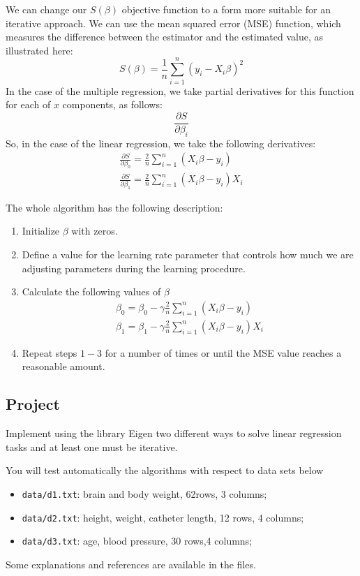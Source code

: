 \documentclass[12pt]{article}
\begin{document}
We can change our $S(\beta)$ objective function to a form more suitable for an iterative approach. We can use the mean squared error (MSE) function, which measures the difference between the estimator and the estimated value, as illustrated here:
$$
S(\beta)=\frac{1}{n} \sum_{i=1}^{n}\left(y_{i}-X_{i} \beta\right)^{2}
$$
In the case of the multiple regression, we take partial derivatives for this function for each of $x$ components, as follows:
$$
\frac{\partial S}{\partial \beta_{i}}
$$
So, in the case of the linear regression, we take the following derivatives:
$$
\begin{array}{l}
\frac{\partial S}{\partial \beta_{0}}=\frac{2}{n} \sum_{i=1}^{n}\left(X_{i} \beta-y_{i}\right) \\
\frac{\partial S}{\partial \beta_{1}}=\frac{2}{n} \sum_{i=1}^{n}\left(X_{i} \beta-y_{i}\right) X_{i}
\end{array}
$$

The whole algorithm has the following description:
\begin{enumerate}
    \item  Initialize $\beta$ with zeros.
    \item Define a value for the learning rate parameter that controls how much we are adjusting parameters during the learning procedure.
    \item Calculate the following values of $\beta$
    $$
    \begin{array}{l}
    \beta_{0}=\beta_{0}-\gamma \frac{2}{n} \sum_{i=1}^{n}\left(X_{i} \beta-y_{i}\right) \\
    \beta_{1}=\beta_{1}-\gamma \frac{2}{n} \sum_{i=1}^{n}\left(X_{i} \beta-y_{i}\right) X_{i}
    \end{array}
    $$
    \item Repeat steps $1-3$ for a number of times or until the MSE value reaches a reasonable amount.
\end{enumerate}

\subsection{Project}
Implement using the library Eigen two different ways to solve linear regression tasks and at least one must be iterative.

You will test automatically the algorithms with respect to  data sets below

\begin{itemize}
\item \texttt{data/d1.txt}: brain and body weight, 62rows, 3 columns;
\item \texttt{data/d2.txt}: height, weight, catheter length, 12 rows, 4 columns;
\item \texttt{data/d3.txt}: age, blood pressure, 30 rows,4 columns;
\end{itemize}
Some explanations and references are available in the files.
\end{document}
